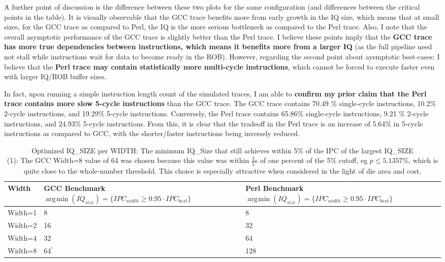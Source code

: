 \documentclass[12pt,portrait]{article}
\DeclareMathOperator*{\argmin}{\arg\!\min}
\begin{document}
A further point of discussion is the difference between these two plots for the same configuration (and differences between the critical points in the table). It is visually observable that the GCC trace benefits more from early growth in the IQ size, which means that at small sizes, for the GCC trace as compared to Perl, the IQ is the more serious bottleneck as compared to the Perl trace. Also, I note that the overall asymptotic performance of the GCC trace is slightly better than the Perl trace. I believe these points imply that the \textbf{GCC trace has more true dependencies between instructions, which means it benefits more from a larger IQ} (as the full pipeline need not stall while instructions wait for data to become ready in the ROB). However, regarding the second point about aysmptotic best-cases: I believe that the \textbf{Perl trace may contain statistically more multi-cycle instructions}, which cannot be forced to execute faster even with larger IQ/ROB buffer sizes.

In fact, upon running a simple instruction length count of the simulated traces, I am able to \textbf{confirm my prior claim that the Perl trace contains more slow 5-cycle instructions} than the GCC trace. The GCC trace contains 70.49 \% single-cycle instructions, 10.2\% 2-cycle instructions, and 19.29\% 5-cycle instructions. Conversely, the Perl trace contains 65.86\% single-cycle instructions, 9.21 \% 2-cycle instructions, and 24.93\% 5-cycle instructions. From this, it is clear that the tradeoff in the Perl trace is an increase of 5.64\% in 5-cycle instructions as compared to GCC, with the shorter/faster instructions being inversely reduced. 


\begin{table}[h]
\centering
\begin{tabular}{|P{2cm}|P{5cm}|P{5cm}|}
\hline
Width &  GCC Benchmark {\tiny $\argmin(IQ_{size}) = \{IPC_{width} \geq 0.95 \cdot IPC_{best}\}$ }&  Perl Benchmark {\tiny $\argmin(IQ_{size}) = \{IPC_{width} \geq 0.95 \cdot IPC_{best}\}$ }\\
\hline
Width=1 & 8 & 8 \\
Width=2 & 16 & 32 \\
Width=4 & 32 & 64 \\
Width=8 & 64\textcolor{MyDarkGreen}{$^{^{1}}$} & 128 \\
\hline
\end{tabular}
\caption{ \small Optimized IQ\_SIZE per WIDTH: The minimum IQ\_Size that still achieves within 5\% of the IPC of the largest IQ\_SIZE\\{\tiny \textcolor{MyDarkGreen}{(1): The GCC Width=8 value of 64 was chosen because this value was within $\frac{2}{5}$s of one percent of the 5\% cutoff, eg $p \leq 5.1357$\%, which is quite close to the whole-number threshold. This choice is especially attractive when considered in the light of die area and cost.}}}
\label{tab:tab1}
\end{table}
\end{document}
